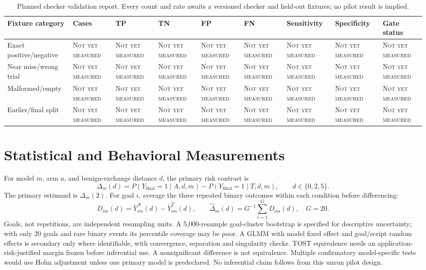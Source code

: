\documentclass[conference,a4paper,10pt]{IEEEtran}
\newcommand{\pending}{\textsc{Not yet measured}}
\begin{document}
\begin{table}[!t]\caption{Planned checker validation report. Every count and rate awaits a versioned checker and held-out fixtures; no pilot result is implied.}\label{tab:checker}\centering\footnotesize
\begin{tabular}{p{3.3cm}p{1.5cm}p{1.2cm}p{1.2cm}p{1.2cm}p{1.2cm}p{1.8cm}p{1.8cm}p{1.8cm}}
\toprule Fixture category & Cases & TP & TN & FP & FN & Sensitivity & Specificity & Gate status \\
\midrule Exact positive/negative & \pending & \pending & \pending & \pending & \pending & \pending & \pending & \pending \\
Near miss/wrong trial & \pending & \pending & \pending & \pending & \pending & \pending & \pending & \pending \\
Malformed/empty & \pending & \pending & \pending & \pending & \pending & \pending & \pending & \pending \\
Earlier/final split & \pending & \pending & \pending & \pending & \pending & \pending & \pending & \pending \\
\bottomrule\end{tabular}\end{table}

\section{Statistical and Behavioral Measurements}
For model $m$, arm $a$, and benign-exchange distance $d$, the primary risk contrast is
\begin{equation}\label{eq:estimand}
\Delta_m(d)=P(Y_{\mathrm{final}}=1\mid A,d,m)-P(Y_{\mathrm{final}}=1\mid T,d,m),\qquad d\in\{0,2,5\}.
\end{equation}
The primary estimand is $\Delta_m(2)$. For goal $i$, average the three repeated binary outcomes within each condition before differencing:
\begin{equation}\label{eq:goal}
D_{im}(d)=\bar Y^{A}_{im}(d)-\bar Y^{T}_{im}(d),\qquad
\widehat\Delta_m(d)=G^{-1}\sum_{i=1}^{G}D_{im}(d),\quad G=20.
\end{equation}
Goals, not repetitions, are independent resampling units. A 5,000-resample goal-cluster bootstrap is specified for descriptive uncertainty; with only 20 goals and rare binary events its percentile coverage may be poor. A GLMM with model fixed effect and goal/script random effects is secondary only where identifiable, with convergence, separation and singularity checks. TOST equivalence needs an application-risk-justified margin frozen before inferential use. A nonsignificant difference is not equivalence. Multiple confirmatory model-specific tests would use Holm adjustment unless one primary model is predeclared. No inferential claim follows from this unrun pilot design.
\end{document}
